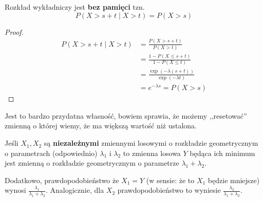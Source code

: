 \begin{theorem}[Lemat 8.4 P\&C]
    Rozkład wykładniczy jest \textbf{bez pamięci} tzn.
    \[ 
        P(X > s + t \mid X > t) = P(X > s)
    \]
\end{theorem}
\begin{proof}
    \begin{align*}
            P(X > s + t \mid X > t) &= \frac{P(X > s + t)}{P(X > t)} \\
            &= \frac{1 - P(X \leq s + t)}{1 - P(X \leq t)} \\
            &= \frac{\exp(-\lambda(s + t))}{\exp(-\lambda t)} \\
            &= e^{-\lambda s} = P(X > s)
    \end{align*}
\end{proof}

Jest to bardzo przydatna własność, bowiem sprawia, że możemy ,,resetować'' zmienną o której wiemy, że ma większą wartość niż ustalona.

\begin{theorem}[Lemat 8.5 P\&C]
\label{lemat8.5}
Jeśli \(X_1, X_2\) są \textbf{niezależnymi} zmiennymi losowymi o rozkładzie geometrycznym o parametrach (odpowiednio) \(\lambda_1\) i \(\lambda_2\) to zmienna losowa \(Y\) będąca ich minimum jest zmienną o rozkładzie geometrycznym o parametrze \( \lambda_1 + \lambda_2 \).
    
Dodatkowo, prawdopodobieństwo że \(X_1 = Y\) (w sensie: że to \(X_1\) będzie mniejsze) wynosi \( \frac{\lambda_1}{\lambda_1 + \lambda_2} \). Analogicznie, dla \(X_2\) prawdopodobieństwo to wyniesie \( \frac{\lambda_2}{\lambda_1 + \lambda_2} \).
\end{theorem}

